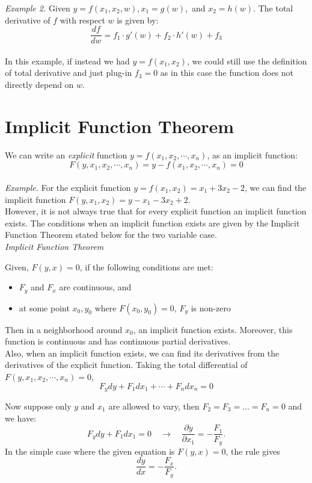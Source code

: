 \documentclass{./../../latex/handout}
\begin{document}
\textit{Example 2.} Given $y=f\left(x_{1}, x_{2}, w\right), x_{1}=g(w),$ and $x_{2}=h(w)$. The total derivative of $f$ with respect $w$ is given by:
\[ \frac{d f}{d w} = f_1 \cdot g'(w) +f_2 \cdot h'(w)  + f_3 \] \\
In this example, if instead we had $y=f(x_1, x_2)$, we could still use the definition of total derivative and just plug-in $f_3=0$ as in this case the function does not directly depend on $w$. 

\section*{Implicit Function Theorem}

We can write an \textit{explicit} function $y=f\left(x_{1}, x_{2}, \cdots, x_{n}\right)$, as an implicit function:
\[F\left(y, x_{1}, x_{2}, \cdots, x_{n}\right)=y-f\left(x_{1}, x_{2}, \cdots, x_{n}\right)=0\] \\
\textit{Example.} For the explicit function $y = f (x_1, x_2) = x_1+3x_2-2$, we can find the implicit function $F(y, x_1, x_2) = y-x_1 -3x_2+2.$\\

However, it is not always true that for every explicit function an implicit function exists. The conditions when an implicit function exists are given by the Implicit Function Theorem stated below for the two variable case. \\

\textit{Implicit Function Theorem}

Given, $F\left(y, x \right)=0$, if the following conditions are met:
\begin{itemize}
  \item $F_y$ and $F_x$ are continuous, and
  \item at some point $x_0, y_0$ where $F(x_0,y_0) = 0$, $F_y$ is non-zero 
\end{itemize}
Then in a neighborhood around $x_0$, an implicit function exists. Moreover, this function is continuous and has continuous partial derivatives. \\

Also, when an implicit function exists, we can find its derivatives from the derivatives of the explicit function. Taking the total differential of $F\left(y, x_{1}, x_{2}, \cdots, x_{n}\right)=0$,
\[
F_{y} d y+F_{1} d x_{1}+\cdots+F_{n} d x_{n}=0 
\]

\vspace{1em}
Now suppose only $y$ and $x_{1}$ are allowed to vary, then $F_2=F_3=...=F_n=0$ and we have:
\[
F_{y} d y+F_{1} d x_{1} = 0 \quad \rightarrow \quad \frac{\partial y}{\partial x_{1}}=-\frac{F_{1}}{F_{y}} .
\]
In the simple case where the given equation is $F(y, x)=0$, the rule gives
\[
\frac{d y}{d x}=-\frac{F_{x}}{F_{y}} .
\]
\end{document}
